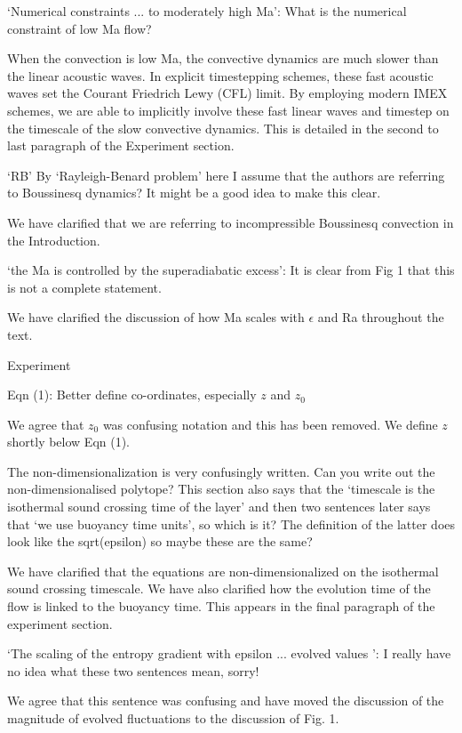 \documentclass[aps, 11pt, singlecolumn]{revtex4-1} %
\begin{document}
\begin{singlespace}
\begin{myquotation}
`Numerical constraints ... to moderately high Ma': What is the
numerical constraint of low Ma flow?
\end{myquotation}
When the convection is low Ma, the convective dynamics are much slower
than the linear acoustic waves.  In explicit timestepping schemes, these
fast acoustic waves set the Courant Friedrich Lewy (CFL) limit.
By employing modern IMEX schemes, we are able to implicitly involve these
fast linear waves and timestep on the timescale of the slow convective
dynamics.    This is detailed in the second to
last paragraph of the Experiment section.

\begin{myquotation}
`RB' By `Rayleigh-Benard problem' here I assume that the
authors are referring to Boussinesq dynamics? It might be a good idea
to make this clear.
\end{myquotation}
We have clarified that we are referring to incompressible Boussinesq convection
in the Introduction.

\begin{myquotation}
`the Ma is controlled by the superadiabatic excess': It is clear
from Fig 1 that this is not a complete statement.
\end{myquotation}
We have clarified the discussion of how Ma scales with $\epsilon$ and
Ra throughout the text.

\begin{myquotation}
Experiment

Eqn (1): Better define co-ordinates, especially $z$ and $z_0$
\end{myquotation}
We agree that $z_0$ was confusing notation and this has been removed.  
We define $z$ shortly below Eqn (1).

\begin{myquotation}
The non-dimensionalization is very confusingly written. Can you write
out the non-dimensionalised polytope? This section also says that the
`timescale is the isothermal sound crossing time of the layer'
and then two sentences later says that `we use buoyancy time
units', so which is it? The definition of the latter does look like
the sqrt(epsilon) so maybe these are the same?
\end{myquotation}
We have clarified that the equations are non-dimensionalized on
the isothermal sound crossing timescale.  We have also clarified
how the evolution time of the flow is linked to the buoyancy time.
This appears in the final paragraph of the experiment section.

\begin{myquotation}
`The scaling of the entropy gradient with epsilon ... evolved
values ': I really have no idea what these two sentences mean,
sorry!
\end{myquotation}
We agree that this sentence was confusing and have moved the
discussion of the magnitude of evolved fluctuations to the
discussion of Fig. 1.


\end{singlespace}
\end{document}
